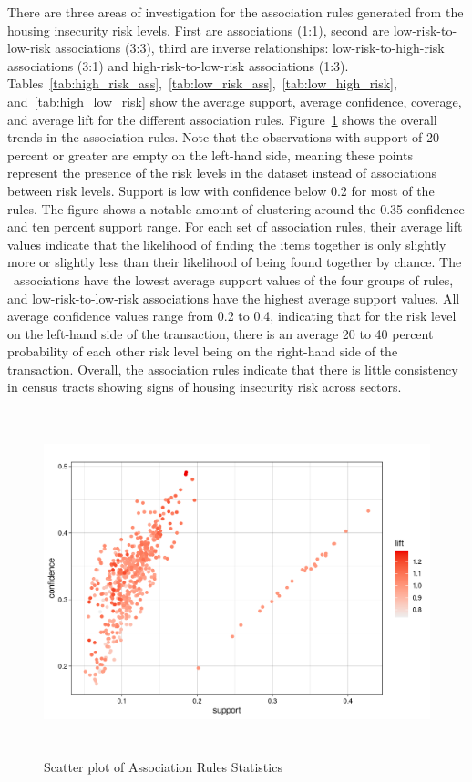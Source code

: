 There are three areas of investigation for the association rules generated from the housing insecurity risk levels. First are \hhr associations (1:1), second are low-risk-to-low-risk associations (3:3), third are inverse relationships: low-risk-to-high-risk associations (3:1) and high-risk-to-low-risk associations (1:3). Tables~\ref{tab:high_risk_ass},~\ref{tab:low_risk_ass},~\ref{tab:low_high_risk}, and~\ref{tab:high_low_risk} show the average support, average confidence, coverage, and average lift for the different association rules. Figure~\ref{fig:assoc_scatter} shows the overall trends in the association rules. Note that the observations with support of 20 percent or greater are empty on the left-hand side, meaning these points represent the presence of the risk levels in the dataset instead of associations between risk levels. Support is low with confidence below 0.2 for most of the rules.  The figure shows a notable amount of clustering around the 0.35 confidence and ten percent support range. For each set of association rules, their average lift values indicate that the likelihood of finding the items together is only slightly more or slightly less than their likelihood of being found together by chance. The \hhr~associations have the lowest average support values of the four groups of rules, and low-risk-to-low-risk associations have the highest average support values. All average confidence values range from 0.2 to 0.4, indicating that for the risk level on the left-hand side of the transaction, there is an average 20 to 40 percent probability of each other risk level being on the right-hand side of the transaction. Overall, the association rules indicate that there is little consistency in census tracts showing signs of housing insecurity risk across sectors. 






 \begin{figure}[htbp]
    \centering
     \includegraphics[width=1\textwidth, height=10cm]{plots/assoc_scatter.png}
     \caption{Scatter plot of Association Rules Statistics}
     \label{fig:assoc_scatter} %
 \end{figure}

